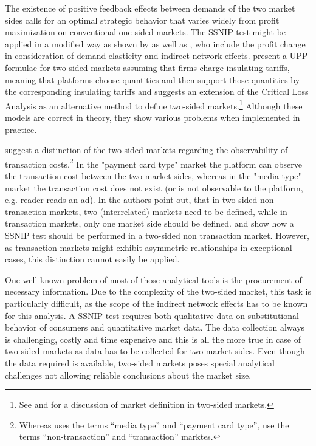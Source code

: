 \documentclass[12pt,a4paper]{scrreprt}
\begin{document}
The existence of positive feedback effects between demands of the two market sides calls for an optimal strategic behavior that varies widely from profit maximization on conventional one-sided markets. The SSNIP test might be applied in a modified way as shown by \cite{filistrucchi_market_2013} as well as \cite{evans_defining_2007}, who include the profit change in consideration of demand elasticity and indirect network effects. \cite{white_insulated_2012} present a UPP formulae for two-sided markets assuming that firms charge insulating tariffs, meaning that platforms choose quantities and then support those quantities by the corresponding insulating tariffs and \cite{noel_analyzing_2005} suggests an extension of the Critical Loss Analysis as an alternative method to define two-sided markets.\footnote{See \cite{evans_two-sided_2012} and \cite{filistrucchi_identifying_2012} for a discussion of market definition in two-sided markets.} Although these models are correct in theory, they show various problems when implemented in practice. 

\cite{filistrucchi_ssnip_2008} suggest a distinction of the two-sided markets regarding the observability of transaction costs.\footnote{Whereas \cite{filistrucchi_ssnip_2008} uses the terms “media type” and “payment card type”, \cite{filistrucchi_market_2013} use the terms “non-transaction” and “transaction” marktes.} In the "payment card type" market the platform can observe the transaction cost between the two market sides, whereas in the "media type" market the transaction cost does not exist (or is not observable to the platform, e.g. reader reads an ad). In \cite{filistrucchi_market_2013} the authors point out, that in two-sided non transaction markets, two (interrelated) markets need to be defined, while in transaction markets, only one market side should be defined. \cite{emch_market_2006} and \cite{alexandrov_antitrust_2011} show how a SSNIP test should be performed in a two-sided non transaction market. However, as transaction markets might exhibit asymmetric relationships in exceptional cases, this distinction cannot easily be applied. 

One well-known problem of most of those analytical tools is the procurement of necessary information. Due to the complexity of the two-sided market, this task is particularly difficult, as the scope of the indirect network effects has to be known for this analysis. A SSNIP test requires both qualitative data on substitutional behavior of consumers and quantitative market data. The data collection always is challenging, costly and time expensive and this is all the more true in case of two-sided markets as data has to be collected for two market sides. Even though the data required is available, two-sided markets poses special analytical challenges not allowing reliable conclusions about the market size. 
\end{document}
